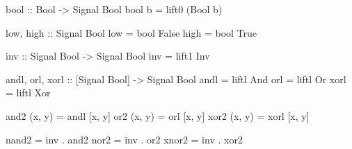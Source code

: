 \begin{haskellcode}
    bool :: Bool -> Signal Bool
    bool b = lift0 (Bool b)

    low, high :: Signal Bool
    low  = bool False
    high = bool True

    inv :: Signal Bool -> Signal Bool
    inv = lift1 Inv

    andl, orl, xorl :: [Signal Bool] -> Signal Bool
    andl = liftl And
    orl  = liftl Or
    xorl = liftl Xor

    and2 (x, y) = andl [x, y]
    or2  (x, y) = orl  [x, y]
    xor2 (x, y) = xorl [x, y]

    nand2 = inv . and2
    nor2  = inv . or2
    xnor2 = inv . xor2
\end{haskellcode}
